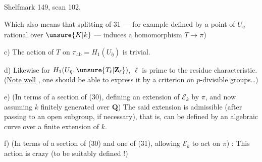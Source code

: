 Shelfmark 149, scan 102.

Which also means that   splitting of 31 --- for example defined by a point of $U_\eta$ rational over $\unsure{K|k}$ --- induces a homomorphism $T\longrightarrow\pi$)

\noindent c) The action of $T$ on $\pi_{\mathrm{ab}}=H_1(U_{\bar\eta})$ is trivial.

\noindent d) Likewise for $H_1(U_{\bar\eta},\unsure{T_\ell|\mathbf Z_\ell})$,  $\ell$ is prime to the residue characteristic. (\uline{Note well}  , one should be able to express it by a criterion on $p$-divisible groups\ldots)

\noindent e) (In terms of a section of (30), defining an extension of $\mathcal E_k$ by $\pi$, and now assuming $k$ finitely generated over $\mathbf Q$) The said extension is admissible (after passing to an open subgroup,  if necessary), that is, can be defined by an algebraic curve over  a finite extension of $k$.

\noindent f) (In terms of a section of (30) and one of (31), allowing $\mathcal E_k$ to act on $\pi$) : This action is   crazy (to be suitably defined !)
